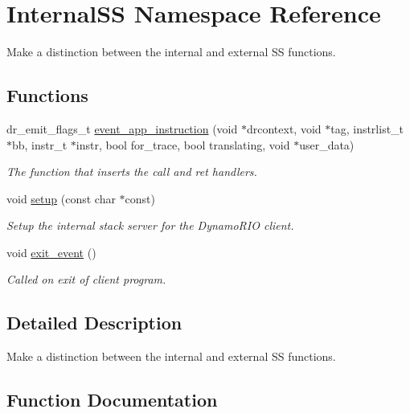 \hypertarget{namespace_internal_s_s}{}\section{Internal\+SS Namespace Reference}
\label{namespace_internal_s_s}


Make a distinction between the internal and external SS functions.  


\subsection*{Functions}
\begin{DoxyCompactItemize}
\item 
dr\+\_\+emit\+\_\+flags\+\_\+t \hyperlink{namespace_internal_s_s_af5fff02fcf86ee0fd0134fc412c128bc}{event\+\_\+app\+\_\+instruction} (void $\ast$drcontext, void $\ast$tag, instrlist\+\_\+t $\ast$bb, instr\+\_\+t $\ast$instr, bool for\+\_\+trace, bool translating, void $\ast$user\+\_\+data)
\begin{DoxyCompactList}\small\item\em The function that inserts the call and ret handlers. \end{DoxyCompactList}\item 
void \hyperlink{namespace_internal_s_s_a91c77a886d93d8526bf619cb3eeeec6c}{setup} (const char $\ast$const)
\begin{DoxyCompactList}\small\item\em Setup the internal stack server for the Dynamo\+R\+IO client. \end{DoxyCompactList}\item 
void \hyperlink{namespace_internal_s_s_a20eb78818d452ee5e8d96e2b39a8f323}{exit\+\_\+event} ()
\begin{DoxyCompactList}\small\item\em Called on exit of client program. \end{DoxyCompactList}\end{DoxyCompactItemize}


\subsection{Detailed Description}
Make a distinction between the internal and external SS functions. 

\subsection{Function Documentation}
